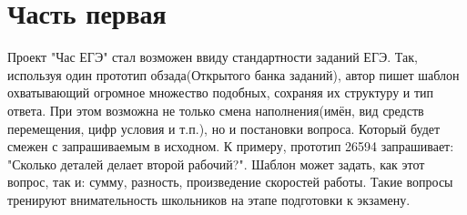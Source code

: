 \documentclass[a4paper,14pt]{article}
\begin{document}
	\section{Часть первая}
	Проект "Час ЕГЭ" стал возможен ввиду стандартности заданий ЕГЭ. Так, используя один прототип обзада(Открытого банка заданий), автор пишет шаблон охватывающий огромное множество подобных, сохраняя их структуру и тип ответа. При этом возможна не только смена наполнения(имён, вид средств перемещения, цифр условия и т.п.), но и постановки вопроса. Который будет смежен с запрашиваемым в исходном. К примеру, прототип 26594 запрашивает: "Сколько деталей делает второй рабочий?". Шаблон может задать, как этот вопрос, так и: сумму, разность, произведение скоростей работы. Такие вопросы тренируют внимательность школьников на этапе подготовки к экзамену. 
 	
\end{document}
